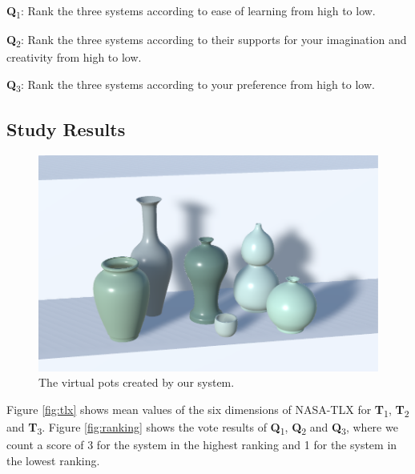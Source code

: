 \documentclass{svjour3}                     %
\begin{document}
\textbf{Q}\textsubscript{1}: Rank the three systems according to ease of learning from high to low.

\textbf{Q}\textsubscript{2}: Rank the three systems according to their supports for your imagination and creativity from high to low.

\textbf{Q}\textsubscript{3}: Rank the three systems according to your preference from high to low.


\subsection{Study Results}
\label{sec:6.4}

\begin{figure}
\includegraphics[width=\textwidth]{pots.png}
\caption{The virtual pots created by our system.}
\label{fig:1}
\end{figure}

Figure \ref{fig:tlx} shows mean values of the six dimensions of NASA-TLX for \textbf{T}\textsubscript{1}, \textbf{T}\textsubscript{2} and \textbf{T}\textsubscript{3}.
Figure \ref{fig:ranking} shows the vote results of \textbf{Q}\textsubscript{1}, \textbf{Q}\textsubscript{2} and \textbf{Q}\textsubscript{3}, where we count a score of 3 for the system in the highest ranking and 1 for the system in the lowest ranking. 
\end{document}
